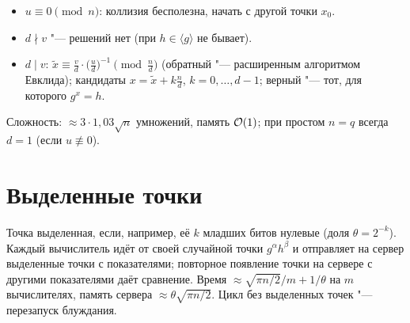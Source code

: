 \documentclass{ca-handout}
\begin{document}
\begin{reminder}[title={Линейное сравнение $ux \equiv v \pmod n$, $d = \gcd(u, n)$}]
\begin{itemize}
  \item $u \equiv 0 \pmod n$: коллизия бесполезна, начать с другой точки $x_0$.
  \item $d \nmid v$ "--- решений нет (при $h \in \langle g \rangle$ не бывает).
  \item $d \mid v$: $\tilde x \equiv \frac vd \cdot \bigl(\frac ud\bigr)^{-1} \pmod{\frac nd}$
    (обратный "--- расширенным алгоритмом Евклида); кандидаты
    $x = \tilde x + k\frac nd$, $k = 0, \dots, d - 1$; верный "--- тот, для которого $g^x = h$.
\end{itemize}
\end{reminder}
Сложность: $\approx 3 \cdot 1{,}03\sqrt n$ умножений, память $\mathcal{O}(1)$; при простом
$n = q$ всегда $d = 1$ (если $u \not\equiv 0$).

\section{Выделенные точки}
\begin{reminder}[title={Метод ван~Ооршота"--~Винера}]
Точка выделенная, если, например, её $k$ младших битов нулевые (доля $\theta = 2^{-k}$).
Каждый вычислитель идёт от своей случайной точки $g^{\alpha}h^{\beta}$ и отправляет на сервер
выделенные точки с показателями; повторное появление точки на сервере с другими показателями
даёт сравнение. Время $\approx \sqrt{\pi n/2}/m + 1/\theta$ на $m$ вычислителях, память
сервера $\approx \theta\sqrt{\pi n/2}$. Цикл без выделенных точек "--- перезапуск блуждания.
\end{reminder}
\end{document}
